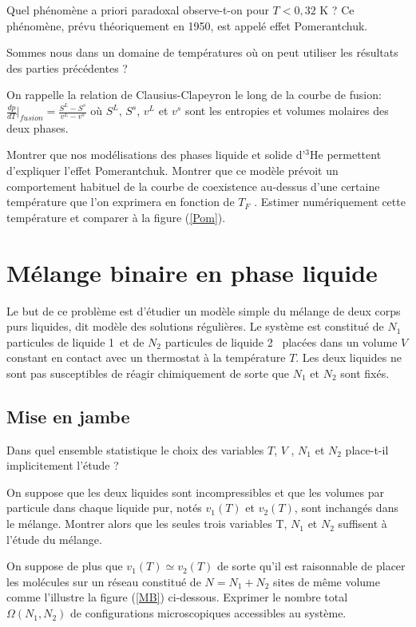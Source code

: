 \documentclass[utf8, 11pt]{feuille}
\begin{document}
\question
Quel phénomène a priori paradoxal observe-t-on pour $T < 0,32$ K ? Ce phénomène, prévu théoriquement en 1950, est appelé \og effet Pomerantchuk\fg.

\question
Sommes nous dans un domaine de températures où on peut utiliser les résultats des parties précédentes ?

On rappelle la relation de Clausius-Clapeyron le long de la courbe de fusion: $\frac{dp}{dT}\vert_{fusion}=\frac{S^L-S^s}{v^L-v^s}$ où $S^L$, $S^s$, $v^L$ et $v^s$ sont les entropies et volumes molaires des deux phases.

\question
Montrer que nos modélisations des phases liquide et solide d'$^3$He permettent d'expliquer l'effet
Pomerantchuk. Montrer  que ce modèle prévoit un comportement habituel de la courbe de coexistence au-dessus d'une certaine température que l'on exprimera en fonction de $T_F$ . Estimer numériquement cette température et comparer à la figure (\ref{Pom}).



\section{Mélange binaire en phase liquide}

Le but de ce problème est d'étudier un modèle simple du mélange de deux corps purs
liquides, dit \og modèle des solutions régulières\fg. Le système est constitué de $N_1$ particules de \og liquide 1\fg \ et de $N_2$ particules de \og liquide 2 \fg \ placées dans un volume $V$ constant en contact avec un thermostat à la température $T$. Les deux liquides ne sont pas susceptibles de réagir chimiquement de sorte que $N_1$ et $N_2$ sont fixés.

\subsection*{Mise en jambe}

\question
Dans quel ensemble statistique le choix des variables $T$, $V$ , $N_1$ et $N_2$ place-t-il implicitement l'étude ?

\question
On suppose que les deux liquides sont incompressibles et que les volumes par particule dans chaque liquide pur, notés $v_1(T)$ et $v_2(T)$, sont inchangés dans le mélange. Montrer alors que les seules trois variables T, $N_1$ et $N_2$ suffisent à l'étude du mélange.

\question
On suppose de plus que $v_1(T) \simeq v_2(T)$ de sorte qu'il est raisonnable de placer les molécules sur un réseau constitué de $N=N_1+N_2$ sites de même volume comme l'illustre la figure (\ref{MB}) ci-dessous. Exprimer le nombre total $\Omega(N_1, N_2)$ de configurations microscopiques accessibles au système.
\end{document}
